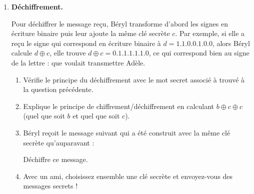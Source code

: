 \documentclass[class=report,crop=false, 12pt]{standalone}
\begin{document}
\begin{activite}
\begin{enumerate}
  \item \textbf{Déchiffrement.}
  
Pour déchiffrer le message reçu, Béryl transforme d'abord les signes en écriture binaire puis leur ajoute la même clé secrète $c$. Par exemple, si elle a reçu le signe
qui correspond en écriture binaire à $d = 1.1.0.0.1.0.0$, alors Béryl calcule $d \oplus c$, elle trouve $d \oplus c = 0.1.1.1.1.1.0$, ce qui correspond bien au signe de la lettre  :
que voulait transmettre Adèle.

  \begin{enumerate}
    \item Vérifie le principe du déchiffrement avec le mot secret associé à  trouvé à la question précédente.
    
    \item Explique le principe de chiffrement/déchiffrement en calculant 
    $b \oplus c \oplus c$ (quel que soit $b$ et quel que soit $c$).
        
    \item Béryl reçoit le message suivant qui a été construit avec la même clé secrète qu'auparavant :
    

    
     Déchiffre ce message.
     
    \item Avec un ami, choisissez ensemble une clé secrète et envoyez-vous des messages secrets !
  \end{enumerate} 

\end{enumerate}

\end{activite}
\end{document}

